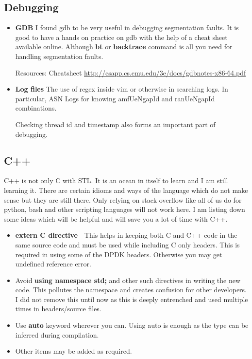 \documentclass{article}
\begin{document}
\subsection{Debugging}
\begin{itemize}
    \item \textbf{GDB}
I found gdb to be very useful in debugging segmentation faults. It is good to have a hands on practice on gdb with the help of a cheat sheet available online. Although \textbf{bt} or \textbf{backtrace} command is all you need for handling segmentation faults.

Resources: Cheatsheet \url{http://csapp.cs.cmu.edu/3e/docs/gdbnotes-x86-64.pdf}
\item \textbf{Log files} The use of regex  inside vim or otherwise in searching logs. In particular, ASN Logs  for knowing amfUeNgapId and ranUeNgapId combinations.

Checking thread id and timestamp also forms an important part of debugging.

\end{itemize}
\subsection{C++}
C++ is not only C with STL. It is an ocean in itself to learn and I am still learning it. There are certain idioms and ways of the language which do not make sense but they are still there. Only relying on stack overflow like all of us do for python, bash and other scripting languages will not work here. I am listing down some ideas which will be helpful and will save you a lot of time with C++.
\begin{itemize}
    \item \textbf{extern C directive} - This helps in keeping both C and C++ code in the same source code and must be used while including C only headers. This is  required in using some of the DPDK headers. Otherwise you may get undefined reference error.
    \item Avoid \textbf{using namespace std;} and other such directives in writing the new code. This pollutes the namespace and creates confusion for other developers. I did not remove this until now as this is deeply entrenched and used multiple times in headers/source files.
    \item Use \textbf{auto} keyword wherever you can. Using auto is enough as the type can be inferred during compilation.
    \item Other items may be added as required.
\end{itemize}
\end{document}
